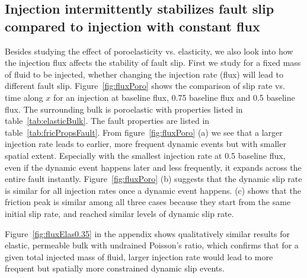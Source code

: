 \subsection{Injection intermittently stabilizes fault slip compared to injection with constant flux} 
Besides studying the effect of poroelasticity vs. elasticity, 
we also look into how the injection flux affects the stability of fault slip. 
First we study for a fixed mass of fluid to be injected, 
whether changing the injection rate (flux) will lead to different fault slip. 
Figure~\ref{fig:fluxPoro} shows the comparison of slip rate vs. time along $x$ for an injection at baseline flux, 
0.75 baseline flux and 0.5 baseline flux. 
The surrounding bulk is poroelastic with properties listed in table~\ref{tab:elasticBulk}. 
The fault properties are listed in table~\ref{tab:fricPropsFault}. 
From figure~\ref{fig:fluxPoro} (a) we see that a larger injection rate leads to earlier, 
more frequent dynamic events but with smaller spatial extent. 
Especially with the smallest injection rate at 0.5 baseline flux, 
even if the dynamic event happens later and less frequently, 
it expands across the entire fault instantly. 
Figure~\ref{fig:fluxPoro} (b) suggests that the dynamic slip rate is similar for all injection rates once a dynamic event happens. 
(c) shows that the friction peak is similar among all three cases because they start from the same initial slip rate, 
and reached similar levels of dynamic slip rate. 

Figure~\ref{fig:fluxElas0.35} in the appendix shows qualitatively similar results for elastic, permeable bulk with undrained Poisson's ratio, 
which confirms that for a given total injected mass of fluid, 
larger injection rate would lead to more frequent but spatially more constrained dynamic slip events. 

